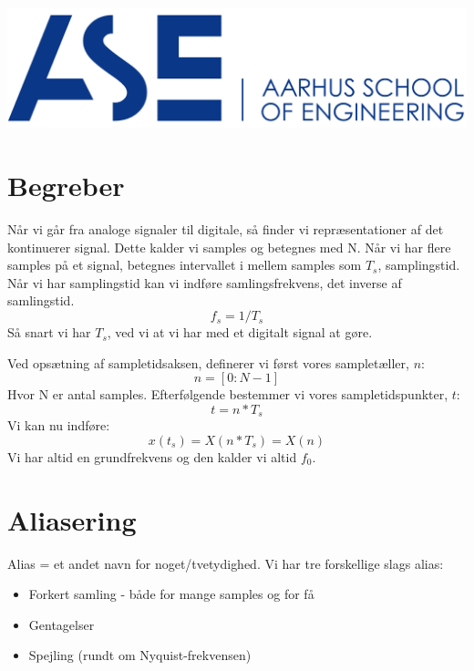 \documentclass[12pt, letterpaper]{article}
\begin{document}
\begin{titlepage}

\includegraphics[scale=0.5]{billeder/au}\\ %
 

\vfill %


\end{titlepage}

\tableofcontents
\newpage

\section{Begreber}

Når vi går fra analoge signaler til digitale, så finder vi repræsentationer af det kontinuerer signal. Dette kalder vi samples og betegnes med N.
Når vi har flere samples på et signal, betegnes intervallet i mellem samples som $T_s$, samplingstid. Når vi har samplingstid kan vi indføre samlingsfrekvens, det inverse af samlingstid. $$f_s = 1/T_s$$
Så snart vi har $T_s$, ved vi at vi har med et digitalt signal at gøre.

Ved opsætning af sampletidsaksen, definerer vi først vores sampletæller, $n$:
$$n = [0:N-1]$$ Hvor N er antal samples.
Efterfølgende bestemmer vi vores sampletidspunkter, $t$:
$$t = n*T_s$$
Vi kan nu indføre:
$$x(t_s) = X(n*T_s) = X(n)$$
Vi har altid en grundfrekvens og den kalder vi altid $f_0$.

\section{Aliasering}

Alias = et andet navn for noget/tvetydighed.
Vi har tre forskellige slags alias:
\begin{itemize}
\item Forkert samling - både for mange samples og for få
\item Gentagelser
\item Spejling (rundt om Nyquist-frekvensen)
\end{itemize}
\end{document}
